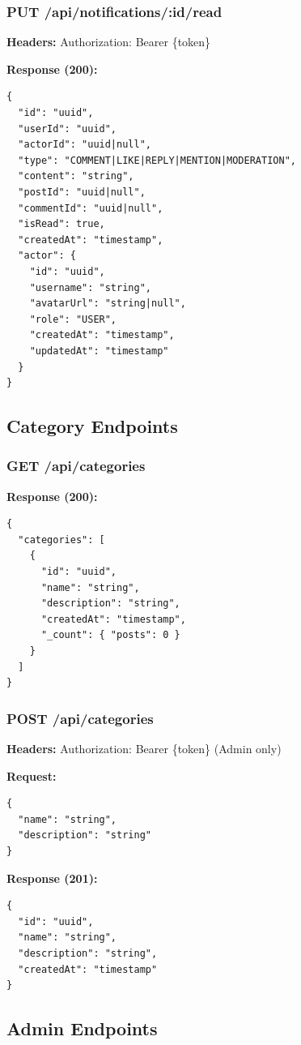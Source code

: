 \documentclass[11pt,a4paper]{article}
\begin{document}
\subsubsection{PUT /api/notifications/:id/read}
\textbf{Headers:} Authorization: Bearer \{token\}

\textbf{Response (200):}
\begin{lstlisting}
{
  "id": "uuid",
  "userId": "uuid",
  "actorId": "uuid|null",
  "type": "COMMENT|LIKE|REPLY|MENTION|MODERATION",
  "content": "string",
  "postId": "uuid|null",
  "commentId": "uuid|null",
  "isRead": true,
  "createdAt": "timestamp",
  "actor": {
    "id": "uuid",
    "username": "string",
    "avatarUrl": "string|null",
    "role": "USER",
    "createdAt": "timestamp",
    "updatedAt": "timestamp"
  }
}
\end{lstlisting}

\subsection{Category Endpoints}

\subsubsection{GET /api/categories}
\textbf{Response (200):}
\begin{lstlisting}
{
  "categories": [
    {
      "id": "uuid",
      "name": "string",
      "description": "string",
      "createdAt": "timestamp",
      "_count": { "posts": 0 }
    }
  ]
}
\end{lstlisting}

\subsubsection{POST /api/categories}
\textbf{Headers:} Authorization: Bearer \{token\} (Admin only)

\textbf{Request:}
\begin{lstlisting}
{
  "name": "string",
  "description": "string"
}
\end{lstlisting}

\textbf{Response (201):}
\begin{lstlisting}
{
  "id": "uuid",
  "name": "string",
  "description": "string",
  "createdAt": "timestamp"
}
\end{lstlisting}

\subsection{Admin Endpoints}
\end{document}
